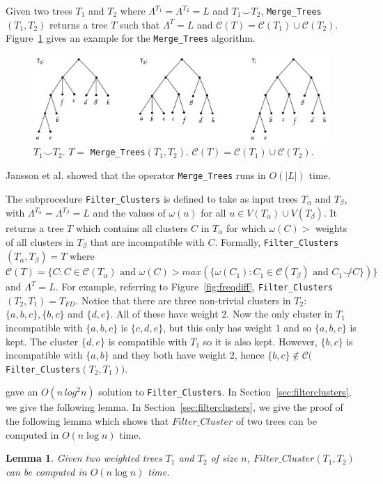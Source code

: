 \documentclass[final,1p,times]{elsarticle}
\newcommand{\compatible}{\smile}
\newcommand{\leafset}{\Lambda}
\newcommand{\weight}{\omega}
\newcommand{\TA}{T_\alpha}
\newcommand{\TB}{T_\beta}
\newtheorem{lemma}[theorem]{Lemma}
\begin{document}
    Given two trees $T_1$ and $T_2$ where $\leafset^{T_1} = \leafset^{T_2} = L$ and $T_1 \compatible T_2$, \texttt{Merge\_Trees}$(T_1, T_2)$ returns a tree $T$ such that $\leafset^T = L$ and $\mathcal{C}(T) = \mathcal{C}(T_1) \cup \mathcal{C}(T_2)$. Figure~\ref{fig:mergetrees} gives an example for the \texttt{Merge\_Trees} algorithm.

    \begin{figure}[ht]
        \includegraphics[scale=0.5]{mergetrees}
        \centering
        \caption[The \texttt{Merge\_Trees} algorithm]{$T_1 \compatible T_2$. $T =$ \texttt{Merge\_Trees}$(T_1, T_2)$. $\mathcal{C}(T) = \mathcal{C}(T_1) \cup \mathcal{C}(T_2)$.}
        \label{fig:mergetrees}
    \end{figure}
    Jansson et al.\cite{jansson2016improved} showed that the operator \texttt{Merge\_Trees} runs in $O(|L|)$ time.

    The subprocedure \texttt{Filter\_Clusters} is defined to take as input trees $\TA$ and $\TB$, with $\leafset^{\TA} = \leafset^{\TB} = L$ and the values of $\weight(u)$ for all $u \in V(\TA) \cup V(\TB)$. It returns a tree $T$ which contains all clusters $C$ in $\TA$ for which $\weight(C) > $ weights of all clusters in $\TB$ that are incompatible with $C$. Formally, \texttt{Filter\_Clusters}$(\TA, \TB) = T$ where $\mathcal{C}(T) = \{C : C \in \mathcal{C}(\TA) \text{ and } \weight(C) > max(\{\weight(C_1) : C_1 \in \mathcal{C}(\TB) \text{ and } C_1 \not\compatible C\})\}$ and $\leafset^T = L$. For example, referring to Figure~\ref{fig:freqdiff}, \texttt{Filter\_Clusters}$(T_2, T_1) = T_{FD}$. Notice that there are three non-trivial clusters in $T_2$: $\{a, b, c\}, \{b, c\}$ and $\{d, e\}$. All of these have weight $2$. Now the only cluster in $T_1$ incompatible with $\{a, b, c\}$ is $\{c, d, e\}$, but this only has weight $1$ and so $\{a, b, c\}$ is kept. The cluster $\{d, e\}$ is compatible with $T_1$ so it is also kept. However, $\{b, c\}$ is incompatible with $\{a, b\}$ and they both have weight $2$, hence $\{b, c\} \not\in \mathcal{C}($\texttt{Filter\_Clusters}$(T_2, T_1))$.

    \cite{jansson2018algorithms} gave an $O(n\,log^2n)$ solution to \texttt{Filter\_Clusters}. In Section~\ref{sec:filterclusters}, we give the following lemma.
    In Section~\ref{sec:filterclusters}, we give the proof of the following lemma which shows that $Filter\_Cluster$ of two trees can be computed in $O(n \log n)$ time.
    \begin{lemma} 
	    \label{lem-filter-cluster-time}
	    Given two weighted trees $T_1$ and $T_2$ of size $n$,
	    $Filter\_Cluster(T_1, T_2)$ can be computed in $O(n \log n)$ time.
    \end{lemma}
\end{document}
